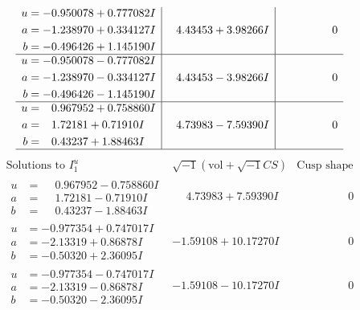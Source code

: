 \documentclass[1p]{elsarticle_modified}
\theoremstyle{definition}
\newcommand{\I}{\sqrt{-1}}
\begin{document}
$$\begin{array}{c|c|c}
\begin{aligned}
u &= -0.950078 + 0.777082 I \\
a &= -1.238970 + 0.334127 I \\
b &= -0.496426 + 1.145190 I\end{aligned}
 & \phantom{-}4.43453 + 3.98266 I & \phantom{-0.000000 } 0 \\ \hline\begin{aligned}
u &= -0.950078 - 0.777082 I \\
a &= -1.238970 - 0.334127 I \\
b &= -0.496426 - 1.145190 I\end{aligned}
 & \phantom{-}4.43453 - 3.98266 I & \phantom{-0.000000 } 0 \\ \hline\begin{aligned}
u &= \phantom{-}0.967952 + 0.758860 I \\
a &= \phantom{-}1.72181 + 0.71910 I \\
b &= \phantom{-}0.43237 + 1.88463 I\end{aligned}
 & \phantom{-}4.73983 - 7.59390 I & \phantom{-0.000000 } 0\\
 \hline 
 \end{array}$$\newpage$$\begin{array}{c|c|c}  
\text{Solutions to }I^u_{1}& \I (\text{vol} + \sqrt{-1}CS) & \text{Cusp shape}\\
 \hline 
\begin{aligned}
u &= \phantom{-}0.967952 - 0.758860 I \\
a &= \phantom{-}1.72181 - 0.71910 I \\
b &= \phantom{-}0.43237 - 1.88463 I\end{aligned}
 & \phantom{-}4.73983 + 7.59390 I & \phantom{-0.000000 } 0 \\ \hline\begin{aligned}
u &= -0.977354 + 0.747017 I \\
a &= -2.13319 + 0.86878 I \\
b &= -0.50320 + 2.36095 I\end{aligned}
 & -1.59108 + 10.17270 I & \phantom{-0.000000 } 0 \\ \hline\begin{aligned}
u &= -0.977354 - 0.747017 I \\
a &= -2.13319 - 0.86878 I \\
b &= -0.50320 - 2.36095 I\end{aligned}
 & -1.59108 - 10.17270 I & \phantom{-0.000000 } 0 \\ \hline\begin{aligned}

\end{aligned}
\end{array}$$
\end{document}
